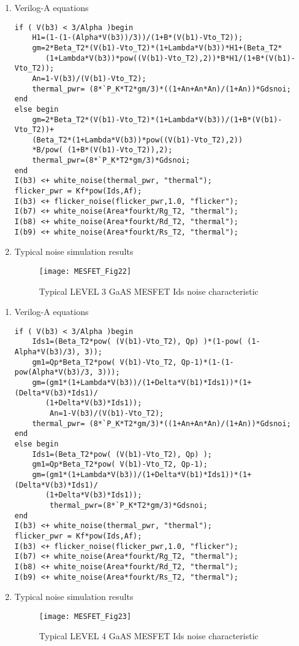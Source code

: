 \begin{enumerate}
 \item Verilog-A equations
\begin{verbatim}
if ( V(b3) < 3/Alpha )begin
	H1=(1-(1-(Alpha*V(b3))/3))/(1+B*(V(b1)-Vto_T2));
	gm=2*Beta_T2*(V(b1)-Vto_T2)*(1+Lambda*V(b3))*H1+(Beta_T2*
	   (1+Lambda*V(b3))*pow((V(b1)-Vto_T2),2))*B*H1/(1+B*(V(b1)-Vto_T2));
	An=1-V(b3)/(V(b1)-Vto_T2); 
	thermal_pwr= (8*`P_K*T2*gm/3)*((1+An+An*An)/(1+An))*Gdsnoi;
end
else begin
	gm=2*Beta_T2*(V(b1)-Vto_T2)*(1+Lambda*V(b3))/(1+B*(V(b1)-Vto_T2))+
	(Beta_T2*(1+Lambda*V(b3))*pow((V(b1)-Vto_T2),2))
	*B/pow( (1+B*(V(b1)-Vto_T2)),2);
	thermal_pwr=(8*`P_K*T2*gm/3)*Gdsnoi;
end
I(b3) <+ white_noise(thermal_pwr, "thermal"); 
flicker_pwr = Kf*pow(Ids,Af);
I(b3) <+ flicker_noise(flicker_pwr,1.0, "flicker");
I(b7) <+ white_noise(Area*fourkt/Rg_T2, "thermal");
I(b8) <+ white_noise(Area*fourkt/Rd_T2, "thermal");
I(b9) <+ white_noise(Area*fourkt/Rs_T2, "thermal"); 
\end{verbatim} 

\item Typical noise simulation results
\begin{figure} [here]
  \centering
  \texttt{[image: MESFET\_Fig22]}  
  \caption{Typical LEVEL 3 GaAS MESFET Ids noise characteristic} 
  \label{fig:fig22} 
\end{figure} 

\end{enumerate}

\begin{enumerate}
 \item Verilog-A equations
\begin{verbatim}
if ( V(b3) < 3/Alpha )begin
	Ids1=(Beta_T2*pow( (V(b1)-Vto_T2), Qp) )*(1-pow( (1-Alpha*V(b3)/3), 3));
	gm1=Qp*Beta_T2*pow( V(b1)-Vto_T2, Qp-1)*(1-(1-pow(Alpha*V(b3)/3, 3)));
	gm=(gm1*(1+Lambda*V(b3))/(1+Delta*V(b1)*Ids1))*(1+(Delta*V(b3)*Ids1)/
	   (1+Delta*V(b3)*Ids1)); 
        An=1-V(b3)/(V(b1)-Vto_T2); 
	thermal_pwr= (8*`P_K*T2*gm/3)*((1+An+An*An)/(1+An))*Gdsnoi;
end
else begin
	Ids1=(Beta_T2*pow( (V(b1)-Vto_T2), Qp) ); 
	gm1=Qp*Beta_T2*pow( V(b1)-Vto_T2, Qp-1);
	gm=(gm1*(1+Lambda*V(b3))/(1+Delta*V(b1)*Ids1))*(1+(Delta*V(b3)*Ids1)/
	   (1+Delta*V(b3)*Ids1)); 
        thermal_pwr=(8*`P_K*T2*gm/3)*Gdsnoi;
end
I(b3) <+ white_noise(thermal_pwr, "thermal"); 
flicker_pwr = Kf*pow(Ids,Af);
I(b3) <+ flicker_noise(flicker_pwr,1.0, "flicker");
I(b7) <+ white_noise(Area*fourkt/Rg_T2, "thermal");
I(b8) <+ white_noise(Area*fourkt/Rd_T2, "thermal");
I(b9) <+ white_noise(Area*fourkt/Rs_T2, "thermal"); 
\end{verbatim} 

\item Typical noise simulation results
\begin{figure} [here]
  \centering
  \texttt{[image: MESFET\_Fig23]}  
  \caption{Typical LEVEL 4 GaAS MESFET Ids noise characteristic} 
  \label{fig:fig23} 
\end{figure} 

\end{enumerate}

